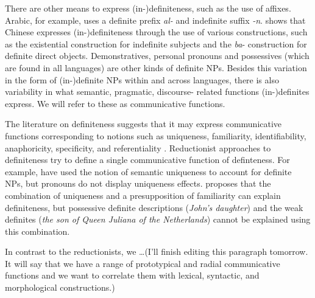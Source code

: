 \documentclass[11pt,letterpaper]{article}
\begin{document}

There are other means to express (in-)definiteness, such as the use of affixes.   Arabic, for example, uses a definite prefix {\it al-} and indefinite suffix {\it -n}. \cite{chen04} shows that Chinese expresses (in-)definiteness through the use of various constructions, such as the existential construction for indefinite subjects and the {\it ba}- construction for definite direct objects. Demonstratives, personal pronouns and possessives (which are found in all languages) are other kinds of definite NPs. Besides this variation in the form of (in-)definite NPs within and across languages, there is also variability in what semantic, pragmatic, discourse- related functions (in-)definites express.   We will refer to these as communicative functions. 

The literature on definiteness suggests that it may express communicative functions corresponding to notions such as uniqueness, familiarity, identifiability, anaphoricity, specificity, and referentiality \citep[\textit{inter alia}]{birner94,condoravdi92,evans77,evans80,gundel88,gundel93,heim90,kadmon87,kadmon90,lyons99,prince92,roberts03,russell05}.  Reductionist approaches to definiteness try to define a single communicative function of definteness.   For example, \citet{kadmon87,evans80} have used the notion of semantic uniqueness to account for definite NPs, but pronouns do not display uniqueness effects. \citet{roberts03} proposes that the combination of uniqueness and a presupposition of familiarity can explain definiteness, but possessive definite descriptions ({\it John's daughter}) and the weak definites ({\it the son of Queen Juliana of the Netherlands}) cannot be explained using this combination.


In contrast to the reductionists, we …(I’ll finish editing this paragraph tomorrow.   It will say that we have a range of prototypical and radial communicative functions and we want to correlate them with lexical, syntactic, and morphological constructions.)
\end{document}
